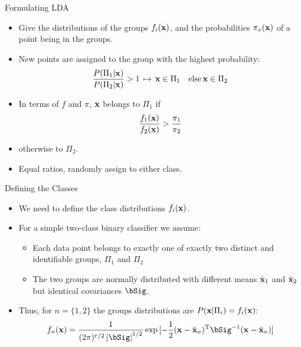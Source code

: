 \documentclass{beamer}
\begin{document}
\begin{frame}{Formulating LDA}
  \begin{itemize}
    \item Give the distributions of the groups $f_i(\mathbf{x})$, and the probabilities $\pi_x(\mathbf{x})$ of a point being in the groups.
    \item New points are assigned to the group with the highest probability:
      \begin{equation*}
        \frac{P(\Pi_1|\mathbf{x})}{P(\Pi_2|\mathbf{x})}>1 \,\mapsto\, \mathbf{x}\in\Pi_1 \quad \mbox{else}\, \mathbf{x}\in\Pi_2
      \end{equation*}
    \item In terms of $f$ and $\pi$, $\mathbf{x}$ belongs to $\Pi_1$ if
      \begin{equation*}
        \frac{f_1(\mathbf{x})}{f_2(\mathbf{x})}>\frac{\pi_1}{\pi_2}\label{eq:classratio}
      \end{equation*}
    \item otherwise to $\Pi_2$. 
    \item Equal ratios, randomly assign to either class.
  \end{itemize}
\end{frame}

\begin{frame}{Defining the Classes}
  \begin{itemize}
    \item We need to define the class distributions $f_i(\mathbf{x})$.
    \item For a simple two-class binary classifier we assume:
      \begin{itemize}
      \item Each data point belongs to exactly one of exactly two distinct and identifiable groups, $\Pi_1$ and $\Pi_2$
      \item The two groups are normally distributed with different means $\bar{\mathbf{x}}_1$ and $\bar{\mathbf{x}}_2$ but identical covariances $\bSig$.
      \end{itemize}
    \item Thus, for $n=\{1,2\}$ the groups distributions are $P(\mathbf{x}|\Pi_i) = f_i(\mathbf{x})$:
      \begin{equation*}
        f_n(\bx) = \frac{1}{(2\pi)^{r/2}\abs{\bSig}^{1/2}}\exp{[-\frac{1}{2}(\bx-\bar\bx_n)^\rT\bSig^{-1}(\bx-\bar\bx_n)]}
      \end{equation*}
  \end{itemize}
\end{frame}
\end{document}

